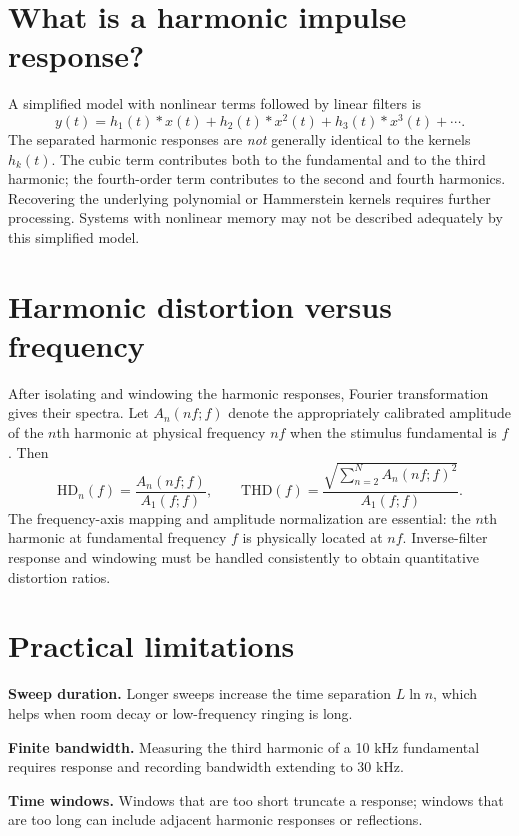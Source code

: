 \documentclass[11pt,a4paper]{article}
\begin{document}
\section{What is a harmonic impulse response?}
A simplified model with nonlinear terms followed by linear filters is
\begin{equation}y(t)=h_1(t)*x(t)+h_2(t)*x^2(t)+h_3(t)*x^3(t)+\cdots.\end{equation}
The separated harmonic responses are \emph{not} generally identical to the kernels $h_k(t)$. The cubic term contributes both to the fundamental and to the third harmonic; the fourth-order term contributes to the second and fourth harmonics. Recovering the underlying polynomial or Hammerstein kernels requires further processing. Systems with nonlinear memory may not be described adequately by this simplified model.

\section{Harmonic distortion versus frequency}
After isolating and windowing the harmonic responses, Fourier transformation gives their spectra. Let $A_n(nf;f)$ denote the appropriately calibrated amplitude of the $n$th harmonic at physical frequency $nf$ when the stimulus fundamental is $f$. Then
\begin{equation}\mathrm{HD}_n(f)=\frac{A_n(nf;f)}{A_1(f;f)},\qquad
\mathrm{THD}(f)=\frac{\sqrt{\displaystyle\sum_{n=2}^{N}A_n(nf;f)^2}}{A_1(f;f)}.\end{equation}
The frequency-axis mapping and amplitude normalization are essential: the $n$th harmonic at fundamental frequency $f$ is physically located at $nf$. Inverse-filter response and windowing must be handled consistently to obtain quantitative distortion ratios.

\section{Practical limitations}
\textbf{Sweep duration.} Longer sweeps increase the time separation $L\ln n$, which helps when room decay or low-frequency ringing is long.

\textbf{Finite bandwidth.} Measuring the third harmonic of a 10 kHz fundamental requires response and recording bandwidth extending to 30 kHz.

\textbf{Time windows.} Windows that are too short truncate a response; windows that are too long can include adjacent harmonic responses or reflections.
\end{document}
